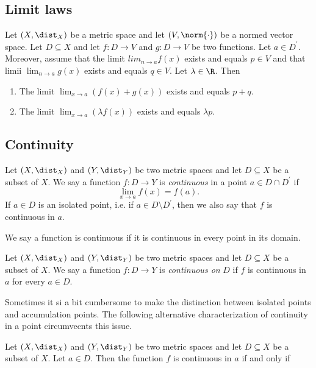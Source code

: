 \subsection{Limit laws}
\begin{theorem}
    Let $(X, \dist_X)$ be a metric space and let $(V, \norm{\cdot})$ be a normed vector space. Let $D \subseteq X$ and
    let $f:D \to V$ and $g: D \to V$ be two functions. Let $a \in D^\prime$. Moreover, assume that the limit $lim_{n\to a}f(x)$
    exists and equals $p \in V$ and that limii $\lim_{n\to a}g(x)$ exists and equals $q \in V$. Let $\lambda \in \R$. Then
    \begin{enumerate}
        \item The limit $\lim_{x \to a}(f(x) + g(x))$ exists and equals $p + q$.
        \item The limit $\lim_{x \to a}(\lambda f(x))$ exists and equals $\lambda p$.
    \end{enumerate}
\end{theorem}

\subsection{Continuity}
\begin{definition}
    Let $(X, \dist_X)$ and $(Y, \dist_Y)$ be two metric spaces and let $D \subseteq X$ be a subset of $X$. We say a function
    $f: D \to Y$ is \emph{continuous} in a point $a \in D \cap D^\prime$ if
    $$\lim_{x \to a} f(x) = f(a).$$
    If $a \in D$ is an isolated point, i.e. if $a \in D \setminus D^\prime$, then we also say that $f$ is continuous in $a$.
\end{definition}

We say a function is continuous if it is continuous in every point in its domain.

\begin{definition}
    Let $(X, \dist_X)$ and $(Y, \dist_Y)$ be two metric spaces and let $D \subseteq X$ be a subset of $X$. We say a function
    $f: D \to Y$ is \emph{continuous on} $D$ if $f$ is continuous in $a$ for every $a \in D$.
\end{definition}

Sometimes it si a bit cumbersome to make the distinction between isolated points and accumulation points. The following alternative
characterization of continuity in a point circumvecnts this issue.

\begin{proposition}
    Let $(X, \dist_X)$ and $(Y, \dist_Y)$ be two metric spaces and let $D \subseteq X$ be a subset of $X$.
    Let $a \in D$. Then the function $f$ is continuous in $a$ if and only if
    \begin{myCenter}
    \end{myCenter}
\end{proposition}

